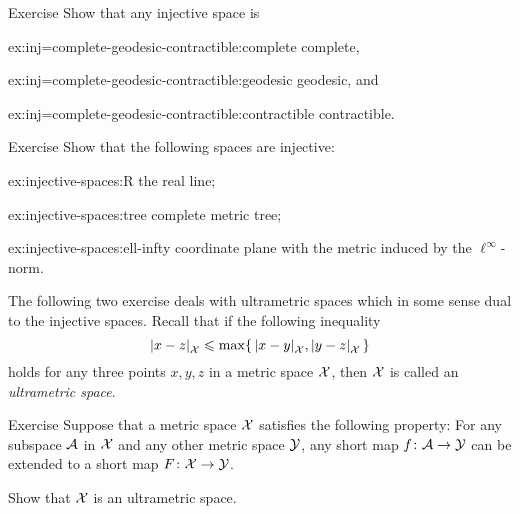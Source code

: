 \begin{thm}{Exercise}\label{ex:inj=complete-geodesic-contractible}
Show that any injective space is 
\begin{multicols}{3}

\begin{subthm}{ex:inj=complete-geodesic-contractible:complete}
complete,
\end{subthm}

\begin{subthm}{ex:inj=complete-geodesic-contractible:geodesic}
geodesic, and
\end{subthm}

\begin{subthm}{ex:inj=complete-geodesic-contractible:contractible}
contractible.
\end{subthm}

\end{multicols}

\end{thm}


\begin{thm}{Exercise}\label{ex:injective-spaces}
Show that the following spaces are injective:
\begin{subthm}{ex:injective-spaces:R}
the real line;
\end{subthm}


\begin{subthm}{ex:injective-spaces:tree}
complete metric tree;
\end{subthm}

\begin{subthm}{ex:injective-spaces:ell-infty}
coordinate plane with the metric induced by the $\ell^\infty$-norm.
\end{subthm}

\end{thm}

The following two exercise deals with ultrametric spaces which in some sense dual to the injective spaces. 
Recall that if the following inequality
\[\dist{x}{z}{\spc{X}}
\le
\max\{\,\dist{x}{y}{\spc{X}},\dist{y}{z}{\spc{X}}\,\}\]
holds for any three points $x,y,z$ in a metric space $\mathcal{X}$,
then $\mathcal{X}$ is called an \emph{ultrametric space}.

\begin{thm}{Exercise}\label{ex:ultrametric}
Suppose that a metric space $\mathcal{X}$ satisfies the following property:
For any subspace $\mathcal{A}$ in $\mathcal{X}$ and any other metric space $\mathcal{Y}$, any short map $f\colon\mathcal{A}\to \mathcal{Y}$ can be extended to a short map $F\colon\mathcal{X}\to \mathcal{Y}$.

Show that $\mathcal{X}$ is an ultrametric space.
\end{thm}


